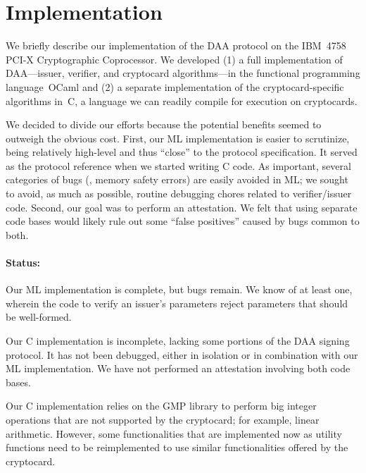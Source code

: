 \section{Implementation}

We briefly describe our implementation of the DAA protocol on the IBM~4758
PCI-X Cryptographic Coprocessor.
We developed (1) a
full implementation of DAA---issuer, verifier, and cryptocard algorithms---in the
functional programming language~OCaml and (2) a separate implementation of the cryptocard-specific algorithms in~C, a language we can readily compile
for execution on cryptocards.

We decided to divide our efforts because the potential benefits seemed to outweigh
the obvious cost.
First, our ML implementation is easier to
scrutinize, being relatively high-level and thus ``close'' to the protocol specification.
It served as the protocol reference when we started writing C code.
As important, several categories of bugs (\eg, memory safety errors) are easily avoided in ML;
we sought to avoid, as much as possible, routine debugging chores related to verifier/issuer code.
Second, our goal was to perform an attestation.
We felt that using separate code bases
would likely rule out some ``false positives'' caused
by bugs common to both.

\paragraph*{Status:}
Our ML implementation is complete, but bugs remain.
We know of at least one, wherein the code to verify an issuer's parameters
reject parameters that should be well-formed.

Our C implementation is incomplete, lacking some portions of
the DAA signing protocol. It has not been debugged, either in isolation
or in combination with our ML implementation. We have
not performed an attestation involving both code bases.

Our C implementation relies on the GMP library
to perform big integer operations that are not supported by the
cryptocard; for example, linear arithmetic. However, some functionalities that are
implemented now as utility functions need to be reimplemented to use similar
functionalities offered by the cryptocard.
